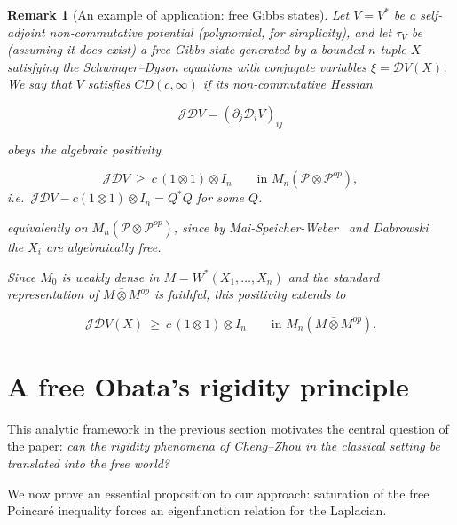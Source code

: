 \documentclass[10pt,a4paper,reqno]{amsart}
\newtheorem{remark}[theorem]{Remark}
\begin{document}
\begin{remark}[An example of application: free Gibbs states]
Let $V=V^\ast$ be a self-adjoint non‑commutative potential (polynomial, for
simplicity), and let $\tau_V$ be (assuming it does exist) a free Gibbs state generated by a bounded
$n$‑tuple $X$ satisfying the Schwinger--Dyson equations with conjugate variables
$\xi=\mathscr D V(X)$.  We say that $V$ satisfies $CD(c,\infty)$ if its
non‑commutative Hessian


\[
\mathscr J\mathscr D V=(\partial_j\mathscr D_i V)_{ij}
\]


obeys the algebraic positivity


\[
\mathscr J\mathscr D V \ \ge\ c\,(1\otimes 1)\otimes I_n
\qquad\text{in } M_n(\mathscr{P}\otimes \mathscr{P}^{op}),
\]
i.e.\ $\mathscr J\mathscr D V - c(1\otimes 1)\otimes I_n = Q^\ast Q$ for some
$Q$.
\par\vspace{0.5em}
equivalently on $M_n(\mathscr{P}\otimes \mathscr{P}^{op})$, since by Mai-Speicher-Weber~\cite{MSW} and Dabrowski~\cite[Lemma~37]{Dab14} the $X_i$ are algebraically free.
\par\vspace{0.5em}
Since $M_0$ is weakly dense in $M=W^\ast(X_1,\ldots,X_n)$ and the standard representation of
$M\bar\otimes M^{op}$ is faithful, this positivity extends to


\[
\mathscr J\mathscr D V(X) \ \ge\ c\,(1\otimes 1)\otimes I_n
\qquad\text{in } M_n(M\bar\otimes M^{op}).
\]
\end{remark}


\section{A free Obata's rigidity principle}
 \bigbreak
 This analytic framework in the previous section motivates the central question of the paper: \emph{can the rigidity phenomena of Cheng--Zhou \cite{ChengZhou} in the classical setting be translated into the free world?}
 \begin{flushleft}
We now prove an essential proposition to our approach: saturation of the free Poincaré inequality forces an eigenfunction relation for the Laplacian.     
 \end{flushleft}
\end{document}
